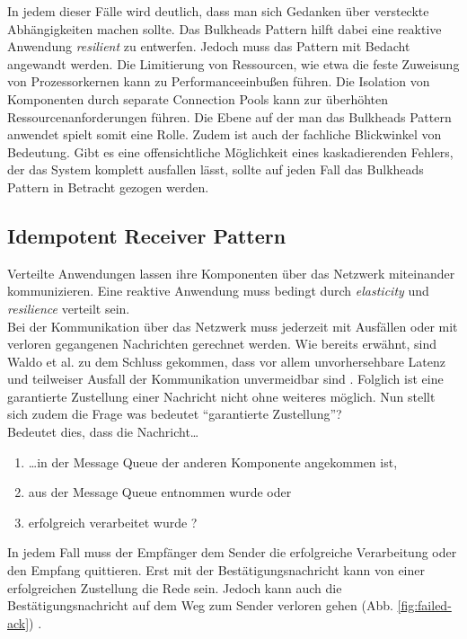 In jedem dieser Fälle wird deutlich, dass man sich Gedanken über versteckte Abhängigkeiten machen sollte. Das Bulkheads Pattern hilft dabei eine reaktive Anwendung \textit{resilient} zu entwerfen. Jedoch muss das Pattern mit Bedacht angewandt werden. Die Limitierung von Ressourcen, wie etwa die feste Zuweisung von Prozessorkernen kann zu Performanceeinbußen führen. Die Isolation von Komponenten durch separate Connection Pools kann zur überhöhten Ressourcenanforderungen führen. Die Ebene auf der man das Bulkheads Pattern anwendet spielt somit eine Rolle. Zudem ist auch der fachliche Blickwinkel von Bedeutung. Gibt es eine offensichtliche Möglichkeit eines kaskadierenden Fehlers, der das System komplett ausfallen lässt, sollte auf jeden Fall das Bulkheads Pattern in Betracht gezogen werden.

\pagebreak

\subsection{Idempotent Receiver Pattern}\label{subsec:idempotent-receiver-pattern}
Verteilte Anwendungen lassen ihre Komponenten über das Netzwerk miteinander kommunizieren. Eine reaktive Anwendung muss bedingt durch \textit{elasticity} und \textit{resilience} verteilt sein.\\
Bei der Kommunikation über das Netzwerk muss jederzeit mit Ausfällen oder mit verloren gegangenen Nachrichten gerechnet werden. Wie bereits erwähnt, sind Waldo et al. zu dem Schluss gekommen, dass vor allem unvorhersehbare Latenz und teilweiser Ausfall der Kommunikation unvermeidbar sind \cite{waldo_note_1994}. Folglich ist eine garantierte Zustellung einer Nachricht nicht ohne weiteres möglich. Nun stellt sich zudem die Frage was bedeutet \enquote{garantierte Zustellung}?\\
Bedeutet dies, dass die Nachricht\ldots

\begin{enumerate}
\item \ldots in der Message Queue der anderen Komponente angekommen ist,
\item aus der Message Queue entnommen wurde oder
\item erfolgreich verarbeitet wurde \cite{akka_message_2016}?
\end{enumerate}

In jedem Fall muss der Empfänger dem Sender die erfolgreiche Verarbeitung oder den Empfang quittieren. Erst mit der Bestätigungsnachricht kann von einer erfolgreichen Zustellung die Rede sein. Jedoch kann auch die Bestätigungsnachricht auf dem Weg zum Sender verloren gehen (Abb. \ref{fig:failed-ack}) \cite[S.~528]{hohpe_enterprise_2004}.

